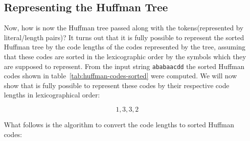 

\subsection{Representing the Huffman Tree}

Now, how is now the Huffman tree passed along with the
tokens(represented by literal/length pairs)? It turns out that it is
fully possible to represent the sorted Huffman tree by the code
lengths of the codes represented by the tree, assuming that these
codes are sorted in the lexicographic order by the symbols which they
are supposed to represent. From the input string \texttt{ababaacdd}
the sorted Huffman codes shown in table~\ref{tab:huffman-codes-sorted}
were computed. We will now show that is fully possible to represent
these codes by their respective code lengths in lexicographical order:

\begin{equation*}
  1,3,3,2
\end{equation*}

What follows is the algorithm to convert the code lengths to sorted
Huffman codes:

